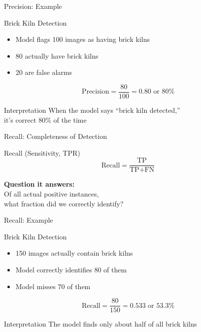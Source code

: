\documentclass{beamer}
\begin{document}
\begin{frame}{Precision: Example}
\begin{examplebox}{Brick Kiln Detection}
\begin{itemize}
    \item Model flags 100 images as having brick kilns
    \item 80 actually have brick kilns
    \item 20 are false alarms
\end{itemize}

\vspace{0.3cm}

$$\text{Precision} = \frac{80}{100} = 0.80 \text{ or } 80\%$$
\end{examplebox}

\vspace{0.3cm}

\begin{keypointsbox}{Interpretation}
When the model says ``brick kiln detected,'' \\
it's correct 80\% of the time
\end{keypointsbox}
\end{frame}

\begin{frame}{Recall: Completeness of Detection}
\begin{definitionbox}{Recall (Sensitivity, TPR)}
$$\text{Recall} = \frac{\text{TP}}{\text{TP} + \text{FN}}$$

\vspace{0.2cm}

\textbf{Question it answers:} \\
Of all actual positive instances, \\
what fraction did we correctly identify?
\end{definitionbox}
\end{frame}

\begin{frame}{Recall: Example}
\begin{examplebox}{Brick Kiln Detection}
\begin{itemize}
    \item 150 images actually contain brick kilns
    \item Model correctly identifies 80 of them
    \item Model misses 70 of them
\end{itemize}

\vspace{0.3cm}

$$\text{Recall} = \frac{80}{150} = 0.533 \text{ or } 53.3\%$$
\end{examplebox}

\vspace{0.3cm}

\begin{keypointsbox}{Interpretation}
The model finds only about half of all brick kilns
\end{keypointsbox}
\end{frame}
\end{document}
